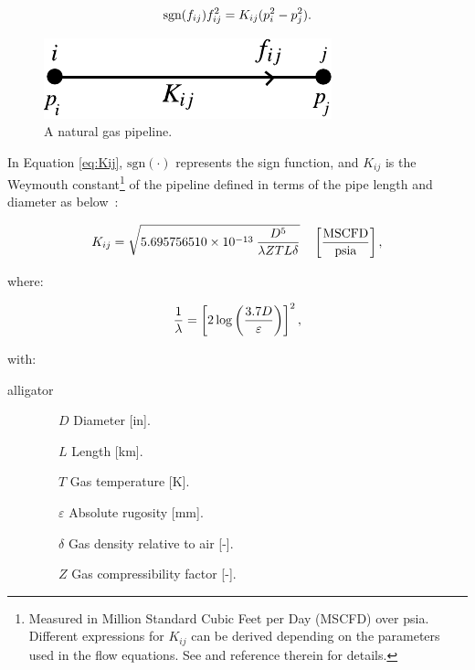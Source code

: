 \begin{equation}
	\label{eq:Weymouth_eq1}
	\text{sgn}(f_{ij})f_{ij}^2 = K_{ij}(p_i^2-p_j^2). 
	\vspace{0.3cm}
\end{equation}

\begin{figure}[!ht]
	\centering
	\includegraphics[scale=1]{Figures/Pipeline}
	\caption{A natural gas pipeline.}	
	\label{fig:pipeline}
\end{figure}

In Equation \ref{eq:Kij}, $\text{sgn}(\cdot)$ represents the sign function, and $K_{ij}$ is the  Weymouth constant\footnote{Measured in Million Standard Cubic Feet per Day (MSCFD) over psia. Different expressions for $K_{ij}$ can be derived depending on the parameters used in the flow equations. See \cite{Woldeyohannes2011} and reference therein for details.} of the pipeline defined in terms of the pipe length and diameter as below~\cite{Wolf2000}:

\begin{equation}
	\label{eq:Kij}
	K_{ij} = \sqrt{5.695756510\times 10^{-13}\:\frac{D^5}{\lambda Z T L\delta}}\quad \left[\frac{\text{MSCFD}}{\text{psia}}\right],
	\vspace{0.3cm}
\end{equation}

where: 

\begin{equation}
	\label{eq:lambda_Kij}
	\frac{1}{\lambda} = \left[2\log \left(\frac{3.7D}{\varepsilon}\right)\right]^2,
	\vspace{0.3cm}
\end{equation}

with:

\begin{labeling}{alligator}
	\item [$\qquad \qquad  D$]  \hspace{0.8cm} Diameter [in].
	\item [$\qquad \qquad  L$]  \hspace{0.8cm} Length [km]. 
	\item [$\qquad \qquad  T$] \hspace{0.8cm} Gas temperature [K].
	\item [$\qquad \qquad  \varepsilon$] \hspace{0.8cm} Absolute rugosity [mm].
	\item [$\qquad \qquad  \delta$] \hspace{0.8cm} Gas density relative to air [-].
	\item [$\qquad \qquad  Z$] \hspace{0.8cm} Gas compressibility factor [-].
\end{labeling}

